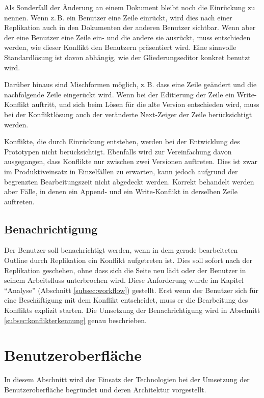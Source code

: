 Als Sonderfall der Änderung an einem Dokument bleibt noch die Einrückung zu nennen. Wenn z.\,B. ein Benutzer eine Zeile einrückt, wird dies nach einer Replikation auch in den Dokumenten der anderen Benutzer sichtbar. Wenn aber der eine Benutzer eine Zeile ein- und die andere sie ausrückt, muss entschieden werden, wie dieser Konflikt den Benutzern präsentiert wird. Eine sinnvolle Standardlösung ist davon abhängig, wie der Gliederungseditor konkret benutzt wird.

Darüber hinaus sind Mischformen möglich, z.\,B. dass eine Zeile geändert und die nachfolgende Zeile eingerückt wird. Wenn bei der Editierung der Zeile ein Write-Konflikt auftritt, und sich beim Lösen für die alte Version entschieden wird, muss bei der Konfliktlösung auch der veränderte Next-Zeiger der Zeile berücksichtigt werden.

Konflikte, die durch Einrückung entstehen, werden bei der Entwicklung des Prototypen nicht berücksichtigt. Ebenfalls wird zur Vereinfachung davon ausgegangen, dass Konflikte nur zwischen zwei Versionen auftreten. Dies ist zwar im Produktiveinsatz in Einzelfällen zu erwarten, kann jedoch aufgrund der begrenzten Bearbeitungszeit nicht abgedeckt werden. Korrekt behandelt werden aber Fälle, in denen ein Append- und ein Write-Konflikt in derselben Zeile auftreten.



\subsection{Benachrichtigung}

Der Benutzer soll benachrichtigt werden, wenn in dem gerade bearbeiteten Outline durch Replikation ein Konflikt aufgetreten ist. Dies soll sofort nach der Replikation geschehen, ohne dass sich die Seite neu lädt oder der Benutzer in seinem Arbeitsfluss unterbrochen wird. Diese Anforderung wurde im Kapitel \enquote{Analyse} (Abschnitt \ref{subsec:workflow}) gestellt. Erst wenn der Benutzer sich für eine Beschäftigung mit dem Konflikt entscheidet, muss er die Bearbeitung des Konflikts explizit starten. Die Umsetzung der Benachrichtigung wird in Abschnitt \ref{subsec:konflikterkennung} genau beschrieben.


\section{Benutzeroberfläche} 

In diesem Abschnitt wird der Einsatz der Technologien bei der Umsetzung der Benutzeroberfläche begründet und deren Architektur vorgestellt.



